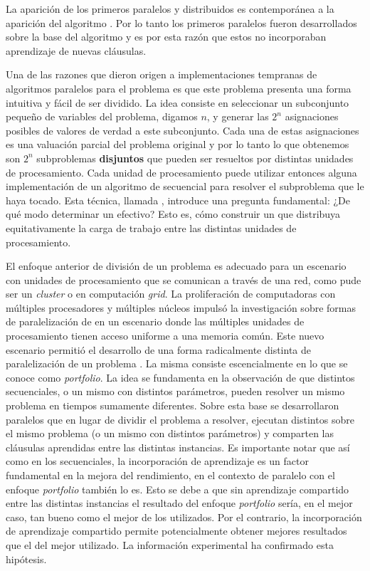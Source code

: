 La aparición de los primeros \ssolvers paralelos y distribuidos
\cite{bohm:1996:afast, zhang:jsc-1996} es contemporánea a la aparición del
algoritmo \CDCL. Por lo tanto los primeros \ssolvers paralelos fueron
desarrollados sobre la base del algoritmo \dpll y es por esta razón que estos
\ssolvers no incorporaban aprendizaje de nuevas cláusulas.

Una de las razones que dieron origen a implementaciones tempranas de
algoritmos paralelos para el problema \sat es que este problema presenta una
forma intuitiva y fácil de ser dividido. La idea consiste en seleccionar un
subconjunto pequeño de variables del problema, digamos $n$, y generar las
$2^n$ asignaciones posibles de valores de verdad a este subconjunto. Cada una
de estas asignaciones es una valuación parcial del problema original y por lo
tanto lo que obtenemos son $2^n$ subproblemas \textbf{disjuntos} que pueden
ser resueltos por distintas unidades de procesamiento. Cada unidad de
procesamiento puede utilizar entonces alguna implementación de un algoritmo de
\ssolving secuencial para resolver el subproblema que le haya tocado. Esta
técnica, llamada \gp\cite{zhang:jsc-1996}, introduce una pregunta fundamental:
¿De qué modo determinar un \gp efectivo? Esto es, cómo construir un \gp que
distribuya equitativamente la carga de trabajo entre las distintas unidades de
procesamiento.

\newcommand{\pfolio}{\emph{portfolio}\xspace}

El enfoque anterior de división de un problema \sat es adecuado para un
escenario con unidades de procesamiento que se comunican a través de una red,
como pude ser un \emph{cluster} o en computación \emph{grid}. La proliferación
de computadoras con múltiples procesadores y múltiples núcleos impulsó la
investigación sobre formas de paralelización de \ssolvers en un escenario
donde las múltiples unidades de procesamiento tienen acceso uniforme a una
memoria común. Este nuevo escenario permitió el desarrollo de una forma
radicalmente distinta de paralelización de un problema \sat. La misma consiste
escencialmente en lo que se conoce como \pfolio. La idea se fundamenta en la
observación de que distintos \ssolvers secuenciales, o un mismo \ssolver con
distintos parámetros, pueden resolver un mismo problema en tiempos sumamente
diferentes. Sobre esta base se desarrollaron \ssolvers paralelos que en lugar
de dividir el problema a resolver, ejecutan distintos \ssolvers sobre el mismo
problema (o un mismo \ssolver con distintos parámetros\cite{hamadi09}) y
comparten las cláusulas aprendidas entre las distintas instancias. Es
importante notar que así como en los \ssolvers secuenciales, la incorporación
de aprendizaje es un factor fundamental en la mejora del rendimiento, en el
contexto de \ssolving paralelo con el enfoque \pfolio también lo es. Esto se
debe a que sin aprendizaje compartido entre las distintas instancias el
resultado del enfoque \pfolio sería, en el mejor caso, tan bueno como el mejor
de los \ssolvers utilizados. Por el contrario, la incorporación de aprendizaje
compartido permite potencialmente obtener mejores resultados que el del mejor
\ssolver utilizado. La información experimental ha confirmado esta hipótesis.

